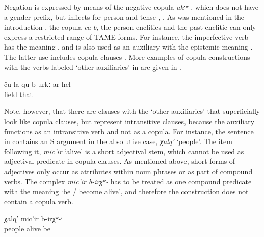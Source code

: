 Negation is expressed by means of the negative copula \textit{akːʷ-}, which does not have a gender prefix, but inflects for person and tense , . As was mentioned in the introduction , the copula \textit{ca-b}, the person enclitics and the past enclitic can only express a restricted range of TAME forms. For instance, the imperfective verb  has the meaning , and is also used as an auxiliary with the epistemic meaning . The latter use includes copula clauses . More examples of copula constructions with the verbs labeled `other auxiliaries' in  are given in .

 \begin{exe}
 \ex	\label{That is probably their field.}
\gll ču-la	qu	b-urkː-ar	hel	\\
	field		that	\\
 \glt	{}
\end{exe}

Note, however, that there are clauses with the `other auxiliaries' that superficially look like copula clauses, but represent intransitive clauses, because the auxiliary functions as an intransitive verb and not as a copula. For instance, the sentence in  contains an S argument in the absolutive case, \textit{χalq'} `people'. The item following it, \textit{mic'ir} `alive' is a short adjectival stem, which cannot be used as adjectival predicate in copula clauses. As mentioned above, short forms of adjectives only occur as attributes within noun phrases or as part of compound verbs. The complex  \textit{mic'ir	b-irχʷ-} has to be treated as one compound predicate with the meaning `be / become alive', and therefore the construction does not contain a copula verb.
 
 \begin{exe}
	\ex	\label{ex:peopleusedtobealive}
	\gll	χalq'	mic'ir	b-irχʷ-i\\
		people	alive	be\\
	\glt	{}
\end{exe}



